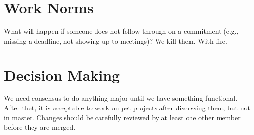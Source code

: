 \section{Work Norms}

What will happen if someone does not follow through on a commitment (e.g., missing a deadline, not showing up to meetings)? We kill them. With fire.

\section{Decision Making}

We need consensus to do anything major until we have something functional. After that, it is acceptable to work on pet projects after discussing them, but not in master. Changes should be carefully reviewed by at least one other member before they are merged.



